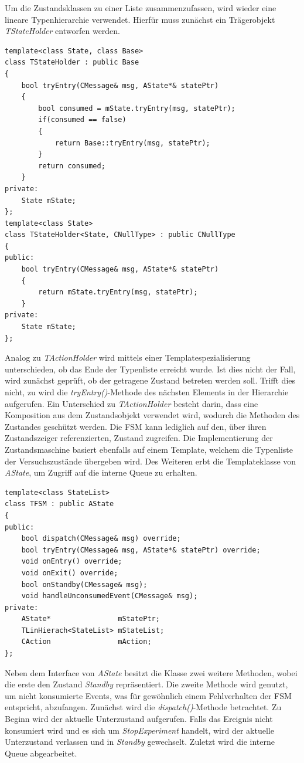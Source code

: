 Um die Zustandsklassen zu einer Liste zusammenzufassen, wird wieder eine lineare Typenhierarchie verwendet. Hierfür muss zunächst ein Trägerobjekt \textit{TStateHolder} entworfen werden. 
\begin{lstlisting}[caption={Implementierung der Trägerklasse für Zustände},captionpos=b]
template<class State, class Base>
class TStateHolder : public Base
{
	bool tryEntry(CMessage& msg, AState*& statePtr)
	{
		bool consumed = mState.tryEntry(msg, statePtr);
		if(consumed == false)
		{
			return Base::tryEntry(msg, statePtr);
		}
		return consumed;
	}
private:
	State mState;
};
template<class State>
class TStateHolder<State, CNullType> : public CNullType
{
public:
	bool tryEntry(CMessage& msg, AState*& statePtr)
	{
		return mState.tryEntry(msg, statePtr);
	}
private:
	State mState;
};
\end{lstlisting}
Analog zu \textit{TActionHolder} wird mittels einer Templatespezialisierung unterschieden, ob das Ende der Typenliste erreicht wurde. Ist dies nicht der Fall, wird zunächst geprüft, ob der getragene Zustand betreten werden soll. Trifft dies nicht, zu wird  die \textit{tryEntry()}-Methode des nächsten Elements in der Hierarchie aufgerufen. Ein Unterschied zu \textit{TActionHolder} besteht darin, dass eine Komposition aus dem Zustandsobjekt verwendet wird, wodurch die Methoden des Zustandes geschützt werden. Die FSM kann lediglich auf den, über ihren Zustandszeiger referenzierten, Zustand zugreifen.
Die Implementierung der Zustandsmaschine basiert ebenfalls auf einem Template, welchem die Typenliste der Versuchszustände übergeben wird. Des Weiteren erbt die Templateklasse von \textit{AState}, um Zugriff auf die interne Queue zu erhalten.
\begin{lstlisting}[caption={Implementierung der Templateklasse für die Zustandsmaschine},captionpos=b]
template<class StateList>
class TFSM : public AState
{
public:
	bool dispatch(CMessage& msg) override;
	bool tryEntry(CMessage& msg, AState*& statePtr) override;
	void onEntry() override;
	void onExit() override;
	bool onStandby(CMessage& msg);
	void handleUnconsumedEvent(CMessage& msg);
private:
	AState*                mStatePtr;
	TLinHierach<StateList> mStateList;
	CAction                mAction;
};
\end{lstlisting}
Neben dem Interface von \textit{AState} besitzt die Klasse zwei weitere Methoden, wobei die erste den Zustand \textit{Standby} repräsentiert. Die zweite Methode wird genutzt, um nicht konsumierte Events, was für gewöhnlich einem Fehlverhalten der FSM entspricht, abzufangen. Zunächst wird die \textit{dispatch()}-Methode betrachtet. Zu Beginn wird der aktuelle Unterzustand aufgerufen. Falls das Ereignis nicht konsumiert wird und es sich um \textit{StopExperiment} handelt, wird der aktuelle Unterzustand verlassen und in \textit{Standby} gewechselt. Zuletzt wird die interne Queue abgearbeitet.
